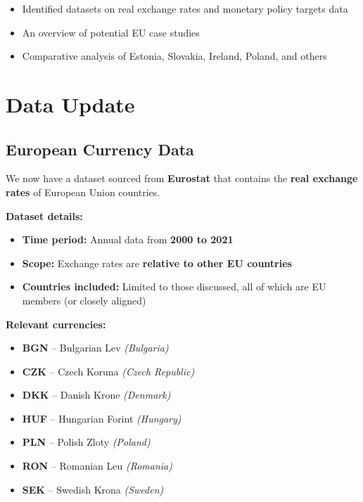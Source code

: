 \documentclass[
  11pt,
]{article}
\providecommand{\tightlist}{%
  \setlength{\itemsep}{0pt}\setlength{\parskip}{0pt}}
\begin{document}
\begin{itemize}
\tightlist
\item
  Identified datasets on real exchange rates and monetary policy targets
  data\\
\item
  An overview of potential EU case studies\\
\item
  Comparative analysis of Estonia, Slovakia, Ireland, Poland, and others
\end{itemize}

\section{Data Update}\label{data-update}

\subsection{European Currency Data}\label{european-currency-data}

We now have a dataset sourced from \textbf{Eurostat} that contains the
\textbf{real exchange rates} of European Union countries.

\textbf{Dataset details:}

\begin{itemize}
\tightlist
\item
  \textbf{Time period:} Annual data from \textbf{2000 to 2021}
\item
  \textbf{Scope:} Exchange rates are \textbf{relative to other EU
  countries}
\item
  \textbf{Countries included:} Limited to those discussed, all of which
  are EU members (or closely aligned)
\end{itemize}

\textbf{Relevant currencies:}

\begin{itemize}
\tightlist
\item
  \textbf{BGN} -- Bulgarian Lev \emph{(Bulgaria)}
\item
  \textbf{CZK} -- Czech Koruna \emph{(Czech Republic)}
\item
  \textbf{DKK} -- Danish Krone \emph{(Denmark)}
\item
  \textbf{HUF} -- Hungarian Forint \emph{(Hungary)}
\item
  \textbf{PLN} -- Polish Zloty \emph{(Poland)}
\item
  \textbf{RON} -- Romanian Leu \emph{(Romania)}
\item
  \textbf{SEK} -- Swedish Krona \emph{(Sweden)}
\end{itemize}
\end{document}
